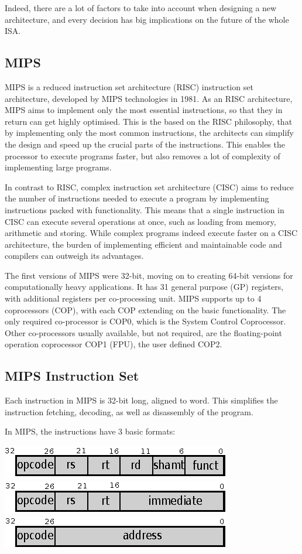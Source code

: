 Indeed, there are a lot of factors to take into account when designing a new
architecture, and every decision has big implications on the future of the
whole ISA.

\subsection{MIPS}
MIPS is a reduced instruction set architecture (RISC) instruction set
architecture, developed by MIPS technologies in 1981. As an RISC
architecture, MIPS aims to implement only the most essential instructions, so
that they in return can get highly optimised. This is the based on the RISC
philosophy, that by implementing only the most common instructions, the
architects can simplify the design and speed up the crucial parts of the
instructions. This enables the processor to execute programs faster, but also
removes a lot of complexity of implementing large programs.

In contrast to RISC, complex instruction set architecture (CISC) aims
to reduce the number of instructions needed to execute a program by
implementing instructions packed with functionality. This means that a single
instruction in CISC can execute several operations at once, such as loading from memory, arithmetic
and storing. While complex programs indeed execute faster on a CISC architecture,
the burden of implementing efficient and maintainable code and compilers can
outweigh its advantages. \cite{Patterson:1980:CRI:641914.641917}

The first versions of MIPS were 32-bit, moving on to creating 64-bit versions
for computationally heavy applications. It has 31 general purpose (GP)
registers, with additional registers per co-processing unit. MIPS supports up
to 4 coprocessors (COP), with each COP extending on the basic functionality. The
only required co-processor is COP0, which is the System Control Coprocessor.
Other co-processors usually available, but not required, are the floating-point operation
coprocessor COP1 (FPU), the user defined COP2.


\subsection{MIPS Instruction Set}
Each instruction in MIPS is 32-bit long, aligned to word. This simplifies the
instruction fetching, decoding, as well as disassembly of the program.

In MIPS, the instructions have 3 basic formats:
\begin{center}
\includegraphics{cpu_architecture/r_format.eps}
\includegraphics{cpu_architecture/i_format.eps}
\includegraphics{cpu_architecture/j_format.eps}
\end{center}



